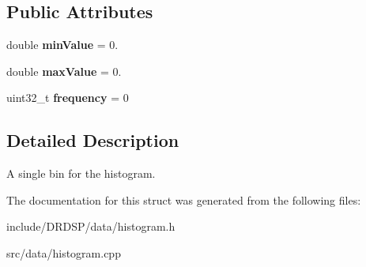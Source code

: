 \subsection*{Public Attributes}
\begin{DoxyCompactItemize}
\item 
\hypertarget{struct_d_r_d_s_p_1_1_bin_a5d097fae91de9385ff6899d8775e42de}{double {\bfseries min\-Value} = 0.}\label{struct_d_r_d_s_p_1_1_bin_a5d097fae91de9385ff6899d8775e42de}

\item 
\hypertarget{struct_d_r_d_s_p_1_1_bin_acb22aeeea00d388c4ae01094316549c4}{double {\bfseries max\-Value} = 0.}\label{struct_d_r_d_s_p_1_1_bin_acb22aeeea00d388c4ae01094316549c4}

\item 
\hypertarget{struct_d_r_d_s_p_1_1_bin_a64a0982f434f1f8826bf3b54b422519d}{uint32\-\_\-t {\bfseries frequency} = 0}\label{struct_d_r_d_s_p_1_1_bin_a64a0982f434f1f8826bf3b54b422519d}

\end{DoxyCompactItemize}


\subsection{Detailed Description}
A single bin for the histogram. 

The documentation for this struct was generated from the following files\-:\begin{DoxyCompactItemize}
\item 
include/\-D\-R\-D\-S\-P/data/histogram.\-h\item 
src/data/histogram.\-cpp\end{DoxyCompactItemize}

